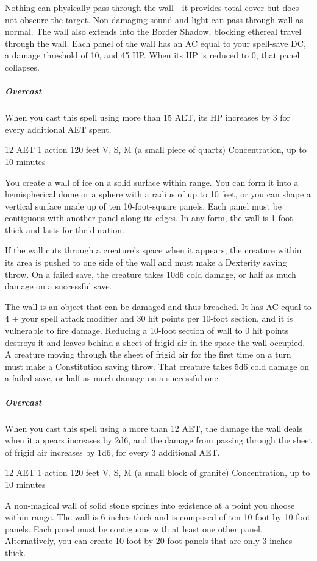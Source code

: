 Nothing can physically pass through the wall---it provides total cover but does not obscure the target. Non-damaging sound and light can pass through wall as normal. The wall also extends into the Border Shadow, blocking ethereal travel through the wall. Each panel of the wall has an AC equal to your spell-save DC, a damage threshold of 10, and 45 HP. When its HP is reduced to 0, that panel collapses.

\subparagraph*{Overcast} When you cast this spell using more than 15 AET, its HP increases by 3 for every additional AET spent.


{12 AET}
{1 action}
{120 feet}
{V, S, M (a small piece of quartz)}
{Concentration, up to 10 minutes}

You create a wall of ice on a solid surface within range. You can form it into a hemispherical dome or a sphere with a radius of up to 10 feet, or you can shape a vertical surface made up of ten 10-foot-square panels. Each panel must be contiguous with another panel along its edges. In any form, the wall is 1 foot thick and lasts for the duration.

If the wall cuts through a creature's space when it appears, the creature within its area is pushed to one side of the wall and must make a Dexterity saving throw. On a failed save, the creature takes 10d6 cold damage, or half as much damage on a successful save.

The wall is an object that can be damaged and thus breached. It has AC equal to 4 + your spell attack modifier and 30 hit points per 10-foot section, and it is vulnerable to fire damage. Reducing a 10-foot section of wall to 0 hit points destroys it and leaves behind a sheet of frigid air in the space the wall occupied. A creature moving through the sheet of frigid air for the first time on a turn must make a Constitution saving throw. That creature takes 5d6 cold damage on a failed save, or half as much damage on a successful one.

\subparagraph*{Overcast} When you cast this spell using a more than 12 AET, the damage the wall deals when it appears increases by 2d6, and the damage from passing through the sheet of frigid air increases by 1d6, for every 3 additional AET.


{12 AET}
{1 action}
{120 feet}
{V, S, M (a small block of granite)}
{Concentration, up to 10 minutes}

A non-magical wall of solid stone springs into existence at a point you choose within range. The wall is 6 inches thick and is composed of ten 10-foot by-10-foot panels. Each panel must be contiguous with at least one other panel. Alternatively, you can create 10-foot-by-20-foot panels that are only 3 inches thick.

